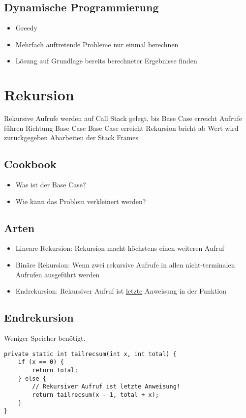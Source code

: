 \begin{multicols*}{4}
	\subsection{Dynamische Programmierung}
		\begin{itemize}
			\item Greedy
			\item Mehrfach auftretende Probleme nur einmal berechnen
			\item Lösung auf Grundlage bereits berechneter Ergebnisse finden
		\end{itemize}

\section{Rekursion}
	\begin{outline}
		\1 Rekursive Aufrufe werden auf Call Stack gelegt, bis Base Case erreicht
		\2 Aufrufe führen Richtung Base Case
		\1 Base Case erreicht
		\2 Rekursion bricht ab
		\2 Wert wird zurückgegeben
		\2 Abarbeiten der Stack Frames
	\end{outline}

	\subsection{Cookbook}
		\begin{itemize}
			\item Was ist der Base Case?
			\item Wie kann das Problem verkleinert werden?
		\end{itemize}
	
	\subsection{Arten}
		\begin{itemize}
			\item Lineare Rekursion: Rekursion macht höchstens einen weiteren Aufruf
			\item Binäre Rekursion: Wenn zwei rekursive Aufrufe in allen nicht-terminalen Aufrufen ausgeführt werden
			\item Endrekursion: Rekursiver Aufruf ist \underline{letzte} Anweisung in der Funktion
		\end{itemize}

	\subsection{Endrekursion}
	Weniger Speicher benötigt.
		\begin{lstlisting}
private static int tailrecsum(int x, int total) {
	if (x == 0) {
		return total;
	} else {
		// Rekursiver Aufruf ist letzte Anweisung!
		return tailrecsum(x - 1, total + x);
	}
}


\end{lstlisting}
\end{multicols*}
